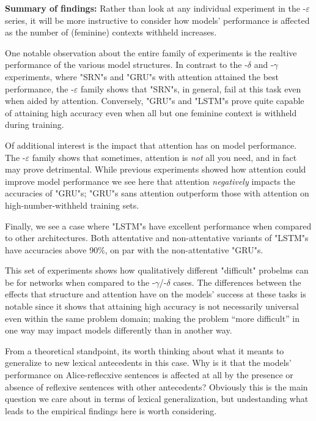 {\bf Summary of findings:} Rather than look at any individual experiment in
the -$\varepsilon$ series, it will be more instructive to consider how models'
performance is affected as the number of (feminine) contexts withheld 
increases.

One notable observation about the entire family of experiments is the realtive
performance of the various model structures. In contrast to the -$\delta$ and
-$\gamma$ experiments, where "SRN"s and "GRU"s with attention attained the
best performance, the -$\varepsilon$ family shows that "SRN"s, in general,
fail at this task even when aided by attention. Conversely, "GRU"s and "LSTM"s
prove quite capable of attaining high accuracy even when all but one feminine
context is withheld during training. 

Of additional interest is the impact that attention has on model performance.
The -$\varepsilon$ family shows that sometimes, attention is {\it not} all
you need, and in fact may prove detrimental. While previous experiments showed
how attention could improve model performance we see here that attention
{\it negatively} impacts the accuracies of "GRU"s; "GRU"s sans attention
outperform those with attention on high-number-withheld training sets.

Finally, we see a case where "LSTM"s have excellent performance when compared
to other architectures. Both attentative and non-attentative variants of 
"LSTM"s have accuracies above 90\%, on par with the non-attentative "GRU"s.

This set of experiments shows how qualitatively different "difficult" probelms
can be for networks when compared to the -$\gamma$/-$\delta$ cases. The 
differences between the effects that structure and attention have on the 
models' success at these tasks is notable since it shows that attaining high
accuracy is not necessarily universal even within the same problem domain;
making the problem ``more difficult'' in one way may impact models differently
than in another way.

From a theoretical standpoint, its worth thinking about what it meants to
generalize to new lexical antecedents in this case. Why is it that the models'
performance on Alice-reflecxive sentences is affected at all by the presence
or absence of reflexive sentences with other antecedents? Obviously this is
the main question we care about in terms of lexical generalization, but 
undestanding what leads to the empirical findings here is worth considering.

